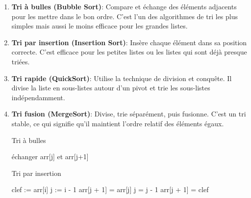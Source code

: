\begin{enumerate}
	\item \textbf{Tri à bulles (Bubble Sort)}: Compare et échange des éléments adjacents pour les mettre dans le bon ordre. C'est l'un des algorithmes de tri les plus simples mais aussi le moins efficace pour les grandes listes. 
	\item \textbf{Tri par insertion (Insertion Sort)}: Insère chaque élément dans sa position correcte. C'est efficace pour les petites listes ou les listes qui sont déjà presque triées.
	
	\item \textbf{Tri rapide (QuickSort)}: Utilise la technique de division et conquête. Il divise la liste en sous-listes autour d'un pivot et trie les sous-listes indépendamment.
	
	\item \textbf{Tri fusion (MergeSort)}: Divise, trie séparément, puis fusionne. C'est un tri stable, ce qui signifie qu'il maintient l'ordre relatif des éléments égaux. 
	
	
	\begin{algorithm}
		\caption{Tri à bulles}
		\label{bulles}
		\begin{algorithmic}[1]
			\State échanger arr[j] et arr[j+1]
			\EndIf
			\EndFor
			\EndFor
		\end{algorithmic}
		\end{algorithm}
		
		
		\begin{algorithm}
			\caption{Tri par insertion}
			\begin{algorithmic}[1]
				\For{i de 1 à n-1}
				\State clef := arr[i]
				\State j := i - 1
				\While{j >= 0 et arr[j] > clef}
				\State arr[j + 1] = arr[j]
				\State j = j - 1
				\EndWhile
				\State arr[j + 1] = clef
				\EndFor
			\end{algorithmic}
			\end{algorithm}
			
			

\end{enumerate}
